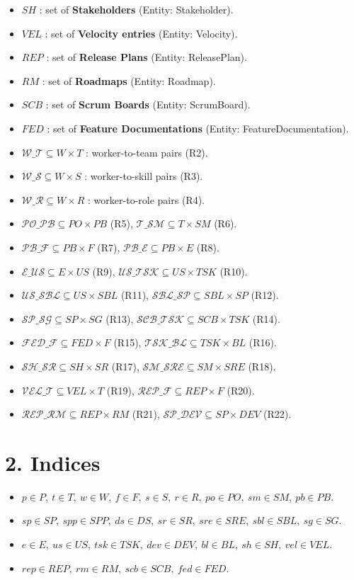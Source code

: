 \documentclass[11pt,a4paper]{article}
\begin{document}
\begin{itemize}
  \item $SH$ : set of \textbf{Stakeholders} (Entity: Stakeholder).
  \item $VEL$ : set of \textbf{Velocity entries} (Entity: Velocity).
  \item $REP$ : set of \textbf{Release Plans} (Entity: ReleasePlan).
  \item $RM$ : set of \textbf{Roadmaps} (Entity: Roadmap).
  \item $SCB$ : set of \textbf{Scrum Boards} (Entity: ScrumBoard).
  \item $FED$ : set of \textbf{Feature Documentations} (Entity: FeatureDocumentation).
  \item $\mathcal{W\_T}\subseteq W\times T$ : worker-to-team pairs (R2).
  \item $\mathcal{W\_S}\subseteq W\times S$ : worker-to-skill pairs (R3).
  \item $\mathcal{W\_R}\subseteq W\times R$ : worker-to-role pairs (R4).
  \item $\mathcal{PO\_PB}\subseteq PO\times PB$ (R5), $\mathcal{T\_SM}\subseteq T\times SM$ (R6).
  \item $\mathcal{PB\_F}\subseteq PB\times F$ (R7), $\mathcal{PB\_E}\subseteq PB\times E$ (R8).
  \item $\mathcal{E\_US}\subseteq E\times US$ (R9), $\mathcal{US\_TSK}\subseteq US\times TSK$ (R10).
  \item $\mathcal{US\_SBL}\subseteq US\times SBL$ (R11), $\mathcal{SBL\_SP}\subseteq SBL\times SP$ (R12).
  \item $\mathcal{SP\_SG}\subseteq SP\times SG$ (R13), $\mathcal{SCB\_TSK}\subseteq SCB\times TSK$ (R14).
  \item $\mathcal{FED\_F}\subseteq FED\times F$ (R15), $\mathcal{TSK\_BL}\subseteq TSK\times BL$ (R16).
  \item $\mathcal{SH\_SR}\subseteq SH\times SR$ (R17), $\mathcal{SM\_SRE}\subseteq SM\times SRE$ (R18).
  \item $\mathcal{VEL\_T}\subseteq VEL\times T$ (R19), $\mathcal{REP\_F}\subseteq REP\times F$ (R20).
  \item $\mathcal{REP\_RM}\subseteq REP\times RM$ (R21), $\mathcal{SP\_DEV}\subseteq SP\times DEV$ (R22).
\end{itemize}

\section{2. Indices}
\begin{itemize}
  \item $p\in P,\ t\in T,\ w\in W,\ f\in F,\ s\in S,\ r\in R,\ po\in PO,\ sm\in SM,\ pb\in PB$.
  \item $sp\in SP,\ spp\in SPP,\ ds\in DS,\ sr\in SR,\ sre\in SRE,\ sbl\in SBL,\ sg\in SG$.
  \item $e\in E,\ us\in US,\ tsk\in TSK,\ dev\in DEV,\ bl\in BL,\ sh\in SH,\ vel\in VEL$.
  \item $rep\in REP,\ rm\in RM,\ scb\in SCB,\ fed\in FED$.
\end{itemize}
\end{document}
